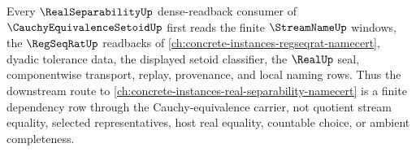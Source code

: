 \begin{theorem}
\label{thm:cauchy-equivalence-setoid-real-separability-orphan-repair}
Every $\RealSeparabilityUp$ dense-readback consumer of $\CauchyEquivalenceSetoidUp$ first reads the finite $\StreamNameUp$ windows, the $\RegSeqRatUp$ readbacks of \autoref{ch:concrete-instances-regseqrat-namecert}, dyadic tolerance data, the displayed setoid classifier, the $\RealUp$ seal, componentwise transport, replay, provenance, and local naming rows. Thus the downstream route to \autoref{ch:concrete-instances-real-separability-namecert} is a finite dependency row through the Cauchy-equivalence carrier, not quotient stream equality, selected representatives, host real equality, countable choice, or ambient completeness.
\end{theorem}
